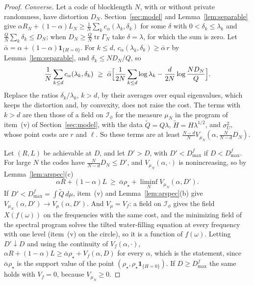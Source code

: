 \documentclass[11pt,onecolumn]{IEEEtran}
\newcommand{\tr}{\operatorname{tr}}
\begin{document}
\begin{proof}
\emph{Converse.} Let a code of blocklength $N$, with or without private
randomness, have distortion $D_N$. Section~\ref{sec:model} and
Lemma~\ref{lem:separable} give
$\alpha R_N+(1-\alpha)L_N\ge\tfrac1N\sum_kc_\alpha(\lambda_k,\delta_k)$
for some $\delta$ with $0<\delta_k\le\lambda_k$ and
$\tfrac QN\sum_k\delta_k\le D_N$; when $D_N\ge\tfrac QN\tr\Gamma_N$ take
$\delta=\lambda$, for which the sum is zero. Let
$\bar\alpha=\alpha+(1-\alpha)\mathbf 1_{\{H=0\}}$. For $k\le d$,
$c_\alpha(\lambda_k,\delta_k)\ge\bar\alpha\,r$ by Lemma~\ref{lem:separable},
and $\delta_k\le ND_N/Q$, so
\[
\frac1N\sum_{k\le d}c_\alpha(\lambda_k,\delta_k)\ \ge\ \bar\alpha\Bigl[\frac1{2N}\sum_{k\le d}\log\lambda_k-\frac d{2N}\log\frac{ND_N}Q\Bigr].
\]
Replace the ratios $\delta_k/\lambda_k$, $k>d$, by their averages over
equal eigenvalues, which keeps the distortion and, by convexity, does
not raise the cost. The terms with $k>d$ are then those of a field on
$\mathcal I_\phi$ for the measure $\mu_N$ in the program of item~(v) of
Section~\ref{sec:model}, with the data $\tilde Q=Q\lambda$,
$\tilde H=H\lambda^{1/2}$, and $\sigma_U^2$, whose point costs are $r$
and $\ell$. So these terms are at least
$\tfrac{N-d}NV_{\mu_N}(\alpha,\tfrac N{N-d}D_N)$.

Let $(R,L)$ be achievable at $D$, and let $D'>D$, with
$D'<D_{\max}^f$ if $D<D_{\max}^f$. For large $N$ the codes have
$\tfrac N{N-d}D_N\le D'$, and $V_{\mu_N}(\alpha,\cdot)$ is nonincreasing,
so by Lemma~\ref{lem:arspec}(c)
\[
\alpha R+(1-\alpha)L\ \ge\ \bar\alpha\rho_\star+\liminf_NV_{\mu_N}(\alpha,D').
\]
If $D'<D_{\max}^f=\int\tilde Q\,d\mu$, item~(v) and
Lemma~\ref{lem:arspec}(b) give $V_{\mu_N}(\alpha,D')\to V_\mu(\alpha,D')$.
And $V_\mu=V_f$: a field on $\mathcal I_\phi$ gives the field $X(f(\omega))$ on the
frequencies with the same cost, and the minimizing field of the
spectral program solves the tilted water-filling equation at every
frequency with one level (item~(v) on the circle), so it is a function
of $f(\omega)$. Letting $D'\downarrow D$ and using the continuity of
$V_f(\alpha,\cdot)$, $\alpha R+(1-\alpha)L\ge\bar\alpha\rho_\star+V_f(\alpha,D)$
for every $\alpha$, which is the statement, since $\bar\alpha\rho_\star$ is
the support value of the point $(\rho_\star,\rho_\star\mathbf 1_{\{H=0\}})$.
If $D\ge D_{\max}^f$ the same holds with $V_f=0$, because
$V_{\mu_N}\ge0$.


\end{proof}
\end{document}
